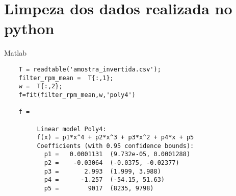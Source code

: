 \chapter{Limpeza dos dados realizada no python}
\label{att_matlab}

Matlab
\lstset{language=Matlab}
\begin{lstlisting}
    T = readtable('amostra_invertida.csv');
    filter_rpm_mean =  T{:,1};
    w =  T{:,2};
    f=fit(filter_rpm_mean,w,'poly4')

    f = 
    
         Linear model Poly4:
         f(x) = p1*x^4 + p2*x^3 + p3*x^2 + p4*x + p5
         Coefficients (with 0.95 confidence bounds):
           p1 =   0.0001131  (9.732e-05, 0.0001288)
           p2 =    -0.03064  (-0.0375, -0.02377)
           p3 =       2.993  (1.999, 3.988)
           p4 =      -1.257  (-54.15, 51.63)
           p5 =        9017  (8235, 9798)

\end{lstlisting}